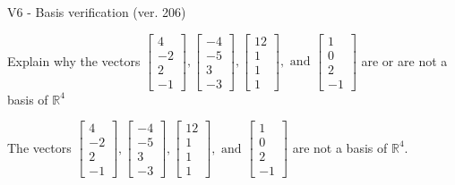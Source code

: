 \begin{exercise}
  \begin{exerciseTitle}V6 - Basis verification (ver. 206)\end{exerciseTitle}
  \begin{exerciseStatement}
    Explain why the vectors \(\left[\begin{array}{r}
4 \\
-2 \\
2 \\
-1
\end{array}\right] , \left[\begin{array}{r}
-4 \\
-5 \\
3 \\
-3
\end{array}\right] , \left[\begin{array}{r}
12 \\
1 \\
1 \\
1
\end{array}\right] , \text{ and } \left[\begin{array}{r}
1 \\
0 \\
2 \\
-1
\end{array}\right]\) are or are not a basis of \(\mathbb{R}^4\)	


  \end{exerciseStatement}
  \begin{exerciseAnswer}
   The vectors \(\left[\begin{array}{r}
4 \\
-2 \\
2 \\
-1
\end{array}\right] , \left[\begin{array}{r}
-4 \\
-5 \\
3 \\
-3
\end{array}\right] , \left[\begin{array}{r}
12 \\
1 \\
1 \\
1
\end{array}\right] , \text{ and } \left[\begin{array}{r}
1 \\
0 \\
2 \\
-1
\end{array}\right]\) 
  	 are not  a basis of \(\mathbb{R}^4\).
  


  \end{exerciseAnswer}
\end{exercise}